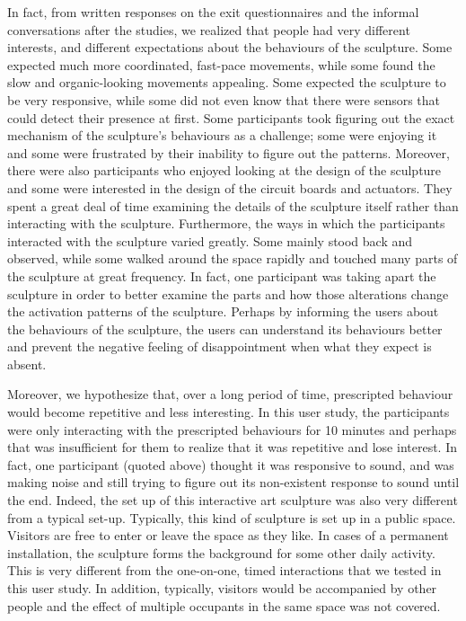 In fact, from written responses on the exit questionnaires and the informal conversations after the studies, we realized that people had very different interests, and different expectations about the behaviours of the sculpture. Some expected much more coordinated, fast-pace movements, while some found the slow and organic-looking movements appealing. Some expected the sculpture to be very responsive, while some did not even know that there were sensors that could detect their presence at first. Some participants took figuring out the exact mechanism of the sculpture's behaviours as a challenge; some were enjoying it and some were frustrated by their inability to figure out the patterns. Moreover, there were also participants who enjoyed looking at the design of the sculpture and some were interested in the design of the circuit boards and actuators. They spent a great deal of time examining the details of the sculpture itself rather than interacting with the sculpture. Furthermore, the ways in which the participants interacted with the sculpture varied greatly. Some mainly stood back and observed, while some walked around the space rapidly and touched many parts of the sculpture at great frequency. In fact, one participant was taking apart the sculpture in order to better examine the parts and how those alterations change the activation patterns of the sculpture. Perhaps by informing the users about the behaviours of the sculpture, the users can understand its behaviours better and prevent the negative feeling of disappointment when what they expect is absent. 

Moreover, we hypothesize that, over a long period of time, prescripted behaviour would become repetitive and less interesting. In this user study, the participants were only interacting with the prescripted behaviours for 10 minutes and perhaps that was insufficient for them to realize that it was repetitive and lose interest. In fact, one participant (quoted above) thought it was responsive to sound, and was making noise and still trying to figure out its non-existent response to sound until the end. Indeed, the set up of this interactive art sculpture was also very different from a typical set-up. Typically, this kind of sculpture is set up in a public space. Visitors are free to enter or leave the space as they like. In cases of a permanent installation, the sculpture forms the background for some other daily activity. This is very different from the one-on-one, timed interactions that we tested in this user study. In addition, typically, visitors would be accompanied by other people and the effect of multiple occupants in the same space was not covered. 

